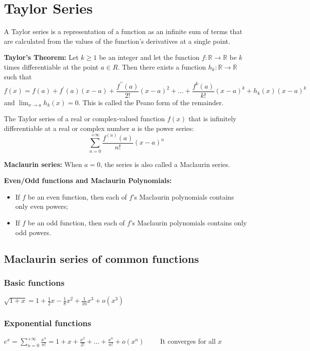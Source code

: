 \section{Taylor Series}
A Taylor series is a representation of a function as an infinite sum of terms that are calculated from the values of the function's derivatives at a single point.

\textbf{Taylor's Theorem:}
Let $k \ge 1$ be an integer and let the function $f : \mathbb{R} \rightarrow \mathbb{R}$ be $k$ times differentiable at the point $a \in R$. Then there exists a function $h_k : \mathbb{R} \rightarrow \mathbb{R}$ such that
\[
f(x) = f(a) + f^{\prime}(a)(x-a) + \frac{f^{\prime\prime}(a)}{2!}(x-a)^2 + ... + \frac{f^{k}(a)}{k!}(x-a)^k + h_k ( x ) (x-a)^k
\]
and $\lim_{x \rightarrow a} h_k ( x ) = 0$. This is called the Peano form of the remainder.


The Taylor series of a real or complex-valued function $f(x)$ that is infinitely differentiable at a real or complex number $a$ is the power series:
\[
\sum_{n=0}^{+\infty}\frac{f^{(n)}(a)}{n!}(x-a)^n
\]

\textbf{Maclaurin series:}
When $a = 0$, the series is also called a Maclaurin series.

\textbf{Even/Odd functions and Maclaurin Polynomials:}
\begin{itemize}
	\item If $f$ be an even function, then each of $f$'s Maclaurin polynomials contains only even powers;
	\item If $f$ be an odd function, then each of $f$'s Maclaurin polynomials contains only odd powers.
\end{itemize}

\subsection{Maclaurin series of common functions}

\subsubsection{Basic functions}
$\displaystyle \sqrt{1+x} = 1 + \frac{1}{2}x - \frac{1}{8}x^2 + \frac{1}{16}x^3 + o(x^3)$ 

\subsubsection{Exponential functions}
$\displaystyle e^x = \sum_{n=0}^{+\infty}\frac{x^n}{n!} = 1 + x + \frac{x^2}{2!} + ... + \frac{x^n}{n!} + o(x^n) $ \ \ \ \ It converges for all $x$

